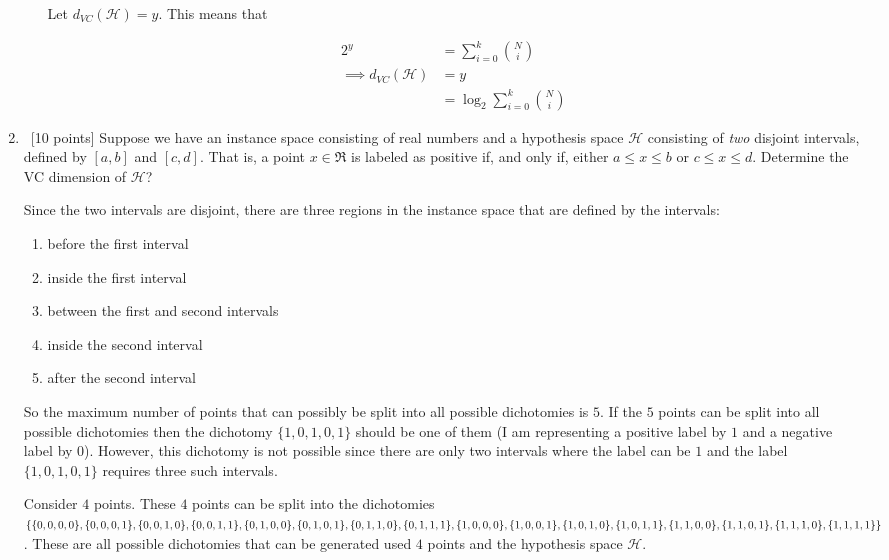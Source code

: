 \begin{enumerate}
\begin{enumerate}
Let $d_{VC}(\mathcal{H}) = y$. This means that

\begin{equation*}
\begin{aligned}
2^y &= \sum_{i=0}^k {N \choose i}\\
\implies d_{VC}(\mathcal{H}) &= y\\
 &= \log_2 \sum_{i=0}^k {N \choose i}
\end{aligned}
\end{equation*}

  \end{enumerate}

\item ~[10 points] Suppose we have an instance space consisting of
  real numbers and a hypothesis space $\mathcal{H}$ consisting of {\em
    two} disjoint intervals, defined by $[a, b]$ and $[c, d]$. That
  is, a point $x \in \Re$ is labeled as positive if, and only if,
  either $a \leq x \leq b$ or $c \leq x \leq d$. Determine the VC
  dimension of $\mathcal{H}$?

Since the two intervals are disjoint, there are three regions in the instance space that are defined by the intervals:

\begin{enumerate}
\item before the first interval
\item inside the first interval
\item between the first and second intervals
\item inside the second interval
\item after the second interval
\end{enumerate}

So the maximum number of points that can possibly be split into all possible dichotomies is $5$. If the $5$ points can be split into all possible dichotomies then the dichotomy $\{1,0,1,0,1\}$ should be one of them (I am representing a positive label by $1$ and a negative label by $0$). However, this dichotomy is not possible since there are only two intervals where the label can be $1$ and the label $\{1,0,1,0,1\}$ requires three such intervals.

Consider $4$ points. These $4$ points can be split into the dichotomies $\{\{0,0,0,0\},\{0,0,0,1\},\\\{0,0,1,0\},\{0,0,1,1\},\{0,1,0,0\},\{0,1,0,1\},\{0,1,1,0\},\{0,1,1,1\},\{1,0,0,0\},\{1,0,0,1\},\\\{1,0,1,0\},\{1,0,1,1\},\{1,1,0,0\},\{1,1,0,1\},\{1,1,1,0\},\{1,1,1,1\}\}$. These are all possible dichotomies that can be generated used $4$ points and the hypothesis space $\mathcal{H}$.\\ 


\end{enumerate}
